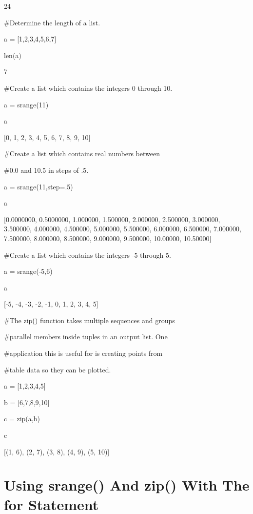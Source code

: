 \documentclass[12pt,oneside]{book}
\begin{document}
24


\#Determine the length of a list.

a = [1,2,3,4,5,6,7]

len(a)

{\textbar}

7


\#Create a list which contains the integers 0 through 10.

a = srange(11)

a

{\textbar}

[0, 1, 2, 3, 4, 5, 6, 7, 8, 9, 10]

\#Create a list which contains real numbers between

\#0.0 and 10.5 in steps of .5.

a = srange(11,step=.5)

a

{\textbar}

[0.0000000, 0.5000000, 1.000000, 1.500000, 2.000000, 2.500000, 3.000000,
3.500000, 4.000000, 4.500000, 5.000000, 5.500000, 6.000000, 6.500000,
7.000000, 7.500000, 8.000000, 8.500000, 9.000000, 9.500000, 10.00000,
10.50000]

\#Create a list which contains the integers {}-5 through 5.

a = srange({}-5,6)

a

{\textbar}

[{}-5, {}-4, {}-3, {}-2, {}-1, 0, 1, 2, 3, 4, 5]

\#The zip() function takes multiple sequences and groups

\#parallel members inside tuples in an output list. One

\#application this is useful for is creating points from

\#table data so they can be plotted.

a = [1,2,3,4,5]

b = [6,7,8,9,10]

c = zip(a,b)

c

{\textbar}

[(1, 6), (2, 7), (3, 8), (4, 9), (5, 10)]

\section[Using srange() And zip() With The for Statement]{ Using srange() And zip() With The for Statement}
\end{document}
